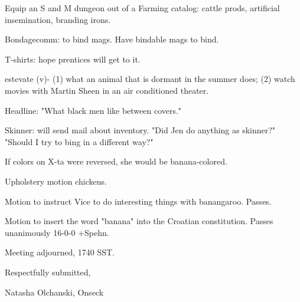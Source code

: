 \documentclass[12pt]{article}
\begin{document}
Equip an S and M dungeon out of a Farming catalog: cattle prods, artificial insemination, branding irons.

Bondagecomm: to bind mags. Have bindable mags to bind.

T-shirts: hope prentices will get to it.

estevate (v)- (1) what an animal that is dormant in the summer does; (2) watch movies with Martin Sheen in an air conditioned theater.

Headline: "What black men like between covers."

Skinner: will send mail about inventory. "Did Jen do anything as skinner?" "Should I try to bing in a different way?"

If colors on X-ta were reversed, she would be banana-colored.

Upholstery motion chickens.

Motion to instruct Vice to do interesting things with banangaroo. Passes.

Motion to insert the word "banana" into the Croatian constitution. Passes unanimously 16-0-0 +Spehn.

\vspace{12pt}

\noindent
Meeting adjourned, 1740 SST.

\vspace{18pt}

\centerline{Respectfully submitted,}
\centerline{Natasha Olchanski, Onseck}
\end{document}
